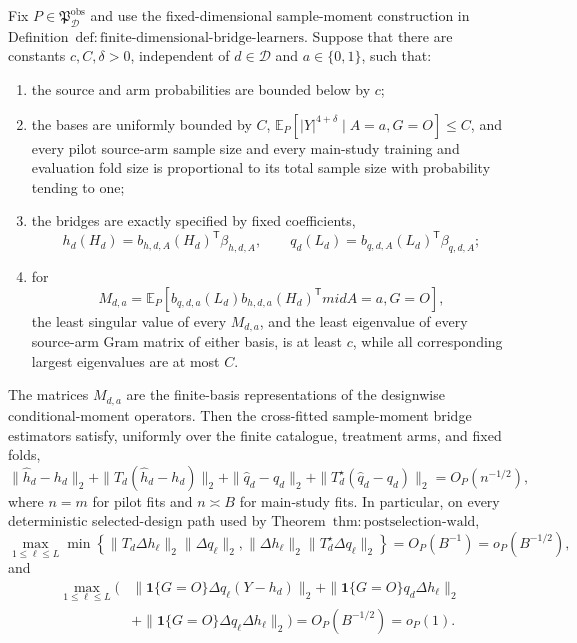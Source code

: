 Fix \(P\in\mathfrak P_{\mathcal D}^{\mathrm{obs}}\) and use the fixed-dimensional sample-moment construction in Definition~\(\mathrm{def{:}finite\text{-}dimensional\text{-}bridge\text{-}learners}\).  Suppose that there are constants \(c,C,\delta>0\), independent of \(d\in\mathcal D\) and \(a\in\{0,1\}\), such that:
\begin{enumerate}
\item the source and arm probabilities are bounded below by \(c\);
\item the bases are uniformly bounded by \(C\), \(\mathbb E_P[|Y|^{4+\delta}\mid A=a,G=O]\le C\), and every pilot source-arm sample size and every main-study training and evaluation fold size is proportional to its total sample size with probability tending to one;
\item the bridges are exactly specified by fixed coefficients,
\[
 h_d(H_d)=b_{h,d,A}(H_d)^{\mathsf T}\beta_{h,d,A},
 \qquad
 q_d(L_d)=b_{q,d,A}(L_d)^{\mathsf T}\beta_{q,d,A};
\]
\item for
\[
 M_{d,a}=\mathbb E_P[b_{q,d,a}(L_d)b_{h,d,a}(H_d)^{\mathsf T}mid A=a,G=O],
\]
the least singular value of every \(M_{d,a}\), and the least eigenvalue of every source-arm Gram matrix of either basis, is at least \(c\), while all corresponding largest eigenvalues are at most \(C\).
\end{enumerate}
The matrices \(M_{d,a}\) are the finite-basis representations of the designwise conditional-moment operators.  Then the cross-fitted sample-moment bridge estimators satisfy, uniformly over the finite catalogue, treatment arms, and fixed folds,
\[
 \|\widehat h_d-h_d\|_2+
 \|T_d(\widehat h_d-h_d)\|_2+
 \|\widehat q_d-q_d\|_2+
 \|T_d^\star(\widehat q_d-q_d)\|_2
 =O_P(n^{-1/2}),                                             \tag{1}
\]
where \(n=m\) for pilot fits and \(n\asymp B\) for main-study fits.  In particular, on every deterministic selected-design path used by Theorem~\(\mathrm{thm{:}postselection\text{-}wald}\),
\[
 \max_{1\le\ell\le L}
 \min\!\left\{
 \|T_d\Delta h_\ell\|_2\|\Delta q_\ell\|_2,
 \|\Delta h_\ell\|_2\|T_d^\star\Delta q_\ell\|_2
 \right\}=O_P(B^{-1})=o_P(B^{-1/2}),                         \tag{2}
\]
and
\[
\begin{aligned}
\max_{1\le\ell\le L}\bigl(&
 \|\mathbf1\{G=O\}\Delta q_\ell(Y-h_d)\|_2
 +\|\mathbf1\{G=O\}q_d\Delta h_\ell\|_2\\
 &+\|\mathbf1\{G=O\}\Delta q_\ell\Delta h_\ell\|_2
 \bigr)=O_P(B^{-1/2})=o_P(1).                               \tag{3}
\end{aligned}
\]

